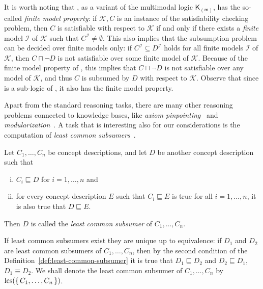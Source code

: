 It is worth noting that \ALC, as a variant of the multimodal logic
$\mathsf{K}_{(\mathsf{m})}$, has the so-called \emph{finite model property}: if
$\mathcal{K}, C$ is an instance of the satisfiability checking problem, then $C$ is
satisfiable with respect to $\mathcal{K}$ if and only if there exists a \emph{finite}
model $\mathcal{I}$ of $\mathcal{K}$ such that $C^{\mathcal{I}} \neq \emptyset$.  This
also implies that the subsumption problem can be decided over finite models only: if
$C^{\mathcal{I}} \subseteq D^{\mathcal{I}}$ holds for all finite models $\mathcal{I}$ of
$\mathcal{K}$, then $C \sqcap \neg D$ is not satisfiable over some finite model of
$\mathcal{K}$.  Because of the finite model property of \ALC, this implies that $C \sqcap
\neg D$ is not satisfiable over any model of $\mathcal{K}$, and thus $C$ is subsumed by
$D$ with respect to $\mathcal{K}$.  Observe that since \ELbot is a sub-logic of \ALC, it
also has the finite model property.

Apart from the standard reasoning tasks, there are many other reasoning problems connected
to knowledge bases, like \emph{axiom pinpointing}~\cite{DBLP:phd/de/Nyssen2009a} and
\emph{modularization}~\cite{conf/www/GrauHKS07}.  A task that is interesting also for our
considerations is the computation of \emph{least common
  subsumers}~\cite{phd/de/Turhan2007,conf/ijcai/BaaderKM99}.

\begin{Definition}
  \label{def:least-common-subsumer}
  Let $C_1, \dots, C_n$ be concept descriptions, and let $D$ be another concept
  description such that
  \begin{enumerate}[i. ]
  \item $C_i \sqsubseteq D$ for $i = 1, \dots, n$ and
  \item for every concept description $E$ such that $C_i \sqsubseteq E$ is true for all $i
    = 1, \dots, n$, it is also true that $D \sqsubseteq E$.
  \end{enumerate}
  Then $D$ is called the \emph{least common subsumer} of $C_{1}, \dots, C_{n}$.
\end{Definition}

If least common subsumers exist they are unique up to equivalence: if $D_1$ and $D_2$ are
least common subsumers of $C_1, \dots, C_n$, then by the second condition of the
Definition~\ref{def:least-common-subsumer} it is true that $D_1 \sqsubseteq D_2$ and $D_2
\sqsubseteq D_1$, \ie $D_1 \equiv D_2$.  We shall denote the least common subsumer of
$C_1, \dots, C_n$ by $\operatorname{lcs}({\{\,C_1, \dots, C_n\,\}})$.

